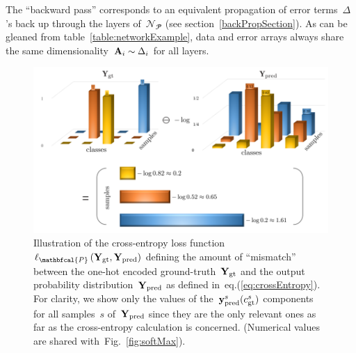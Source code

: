 \documentclass{article}
\begin{document}
\begin{enumerate}
\noindent The ``backward pass'' corresponds to an equivalent propagation of error terms~$\Delta$'s back up through the layers of~$\mathcal{N}_{\mathbfcal{P}}$ (see section~\ref{backPropSection}).  As can be gleaned from table~\ref{table:networkExample}, data and error arrays always share the same dimensionality~${\bf A}_i \sim \Delta_i$ for all layers.

\begin{figure}
\centering
\includegraphics[width=0.9\linewidth]{pptx/crossEntropy/Slide1.png}
\caption{Illustration of the cross-entropy loss function~${\bf \ell}_\mathbfcal{P} \left( {\bf Y}_\text{gt}, {\bf Y}_\text{pred} \right)$ defining the amount of ``mismatch'' between the one-hot encoded ground-truth~${\bf Y}_\text{gt}$ and the output probability distribution~${\bf Y}_\text{pred}$ as defined in~eq.(\ref{eq:crossEntropy}).  For clarity, we show only the values of the~${\bf y}_\text{pred}^s(c_\text{gt}^s)$ components for all samples~$s$ of~${\bf Y}_\text{pred}$ since they are the only relevant ones as far as the cross-entropy calculation is concerned.  (Numerical values are shared with~Fig.~\ref{fig:softMax}).}
\label{fig:crossEntropy}
\end{figure}

\vspace{2cm}


\end{enumerate}
\end{document}
